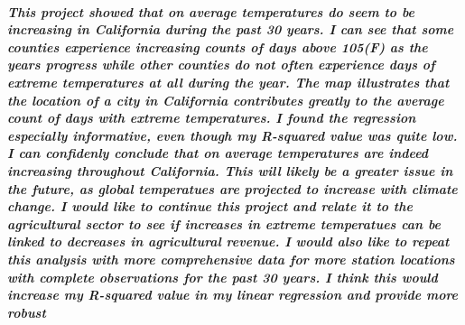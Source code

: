 \documentclass[]{article}
\let\oldsubparagraph\subparagraph
\renewcommand{\subparagraph}[1]{\oldsubparagraph{#1}\mbox{}}
\begin{document}
\hypertarget{this-project-showed-that-on-average-temperatures-do-seem-to-be-increasing-in-california-during-the-past-30-years.-i-can-see-that-some-counties-experience-increasing-counts-of-days-above-105f-as-the-years-progress-while-other-counties-do-not-often-experience-days-of-extreme-temperatures-at-all-during-the-year.-the-map-illustrates-that-the-location-of-a-city-in-california-contributes-greatly-to-the-average-count-of-days-with-extreme-temperatures.-i-found-the-regression-especially-informative-even-though-my-r-squared-value-was-quite-low.-i-can-confidenly-conclude-that-on-average-temperatures-are-indeed-increasing-throughout-california.-this-will-likely-be-a-greater-issue-in-the-future-as-global-temperatues-are-projected-to-increase-with-climate-change.-i-would-like-to-continue-this-project-and-relate-it-to-the-agricultural-sector-to-see-if-increases-in-extreme-temperatues-can-be-linked-to-decreases-in-agricultural-revenue.-i-would-also-like-to-repeat-this-analysis-with-more-comprehensive-data-for-more-station-locations-with-complete-observations-for-the-past-30-years.-i-think-this-would-increase-my-r-squared-value-in-my-linear-regression-and-provide-more-robust-results.}{%
\subparagraph{This project showed that on average temperatures do seem
to be increasing in California during the past 30 years. I can see that
some counties experience increasing counts of days above 105(F) as the
years progress while other counties do not often experience days of
extreme temperatures at all during the year. The map illustrates that
the location of a city in California contributes greatly to the average
count of days with extreme temperatures. I found the regression
especially informative, even though my R-squared value was quite low. I
can confidenly conclude that on average temperatures are indeed
increasing throughout California. This will likely be a greater issue in
the future, as global temperatues are projected to increase with climate
change. I would like to continue this project and relate it to the
agricultural sector to see if increases in extreme temperatues can be
linked to decreases in agricultural revenue. I would also like to repeat
this analysis with more comprehensive data for more station locations
with complete observations for the past 30 years. I think this would
increase my R-squared value in my linear regression and provide more
robust
}}
\end{document}
